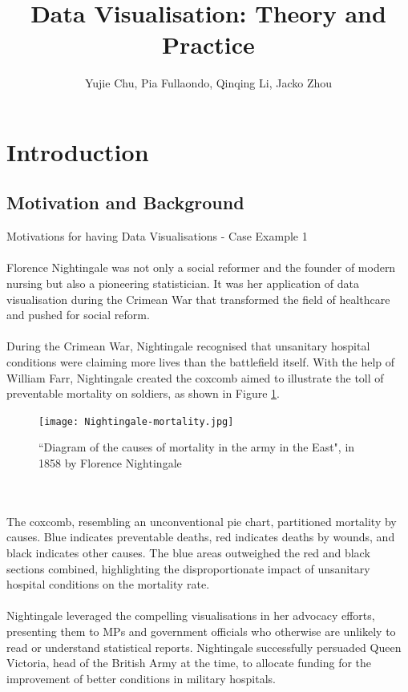 \documentclass{article}\usepackage[]{graphicx}\usepackage[]{xcolor}
\title{Data Visualisation: Theory and Practice}
\author{Yujie Chu, Pia Fullaondo, Qinqing Li, Jacko Zhou}
\begin{document}
\maketitle 
\tableofcontents
\newpage 

\section{Introduction}

\subsection{Motivation and Background}
Motivations for having Data Visualisations - Case Example 1
\\  
\\Florence Nightingale was not only a social reformer and the founder of modern nursing but also a pioneering statistician. It was her application of data visualisation during the Crimean War that transformed the field of healthcare and pushed for social reform.
\\  
\\During the Crimean War, Nightingale recognised that unsanitary hospital conditions were claiming more lives than the battlefield itself. With the help of William Farr, Nightingale created the coxcomb aimed to illustrate the toll of preventable mortality on soldiers, as shown in Figure \ref{fig:coxcomb}.
\\  
\begin{figure}[H]
    \centering
    \texttt{[image: Nightingale-mortality.jpg]}
    \caption{``Diagram of the causes of mortality in the army in the East", in 1858 by Florence Nightingale}
    \label{fig:coxcomb}
\end{figure}
\\   
\\The coxcomb, resembling an unconventional pie chart, partitioned mortality by causes. Blue indicates preventable deaths, red indicates deaths by wounds, and black indicates other causes.
The blue areas outweighed the red and black sections combined, highlighting the disproportionate impact of unsanitary hospital conditions on the mortality rate.
\\   
\\Nightingale leveraged the compelling visualisations in her advocacy efforts, presenting them to MPs and government officials who otherwise are unlikely to read or understand statistical reports. Nightingale successfully persuaded Queen Victoria, head of the British Army at the time, to allocate funding for the improvement of better conditions in military hospitals.
\end{document}
